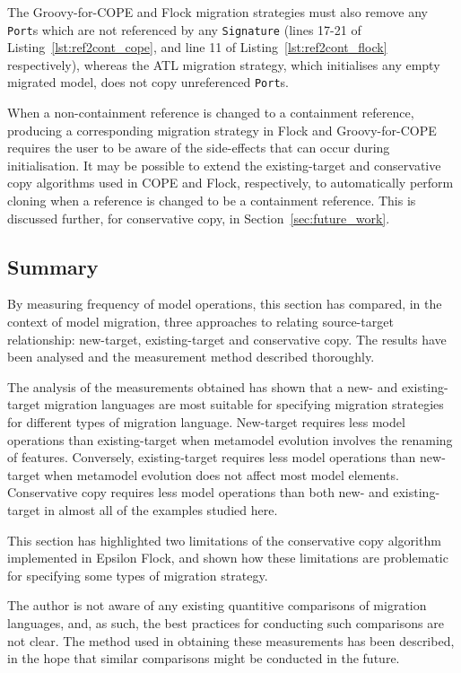 The Groovy-for-COPE and Flock migration strategies must also remove any \texttt{Port}s which are not referenced by any \texttt{Signature} (lines 17-21 of Listing~\ref{lst:ref2cont_cope}, and line 11 of Listing~\ref{lst:ref2cont_flock} respectively), whereas the ATL migration strategy, which initialises any empty migrated model, does not copy unreferenced \texttt{Port}s.

When a non-containment reference is changed to a containment reference, producing a corresponding migration strategy in Flock and Groovy-for-COPE requires the user to be aware of the side-effects that can occur during initialisation. It may be possible to extend the existing-target and conservative copy algorithms used in COPE and Flock, respectively, to automatically perform cloning when a reference is changed to be a containment reference. This is discussed further, for conservative copy, in Section~\ref{sec:future_work}.


\subsection{Summary}
By measuring frequency of model operations, this section has compared, in the context of model migration, three approaches to relating source-target relationship: new-target, existing-target and conservative copy. The results have been analysed and the measurement method described thoroughly.

The analysis of the measurements obtained has shown that a new- and existing-target migration languages are most suitable for specifying migration strategies for different types of migration language. New-target requires less model operations than existing-target when metamodel evolution involves the renaming of features. Conversely, existing-target requires less model operations than new-target when metamodel evolution does not affect most model elements. Conservative copy requires less model operations than both new- and existing-target in almost all of the examples studied here.

This section has highlighted two limitations of the conservative copy algorithm implemented in Epsilon Flock, and shown how these limitations are problematic for specifying some types of migration strategy. 

The author is not aware of any existing quantitive comparisons of migration languages, and, as such, the best practices for conducting such comparisons are not clear. The method used in obtaining these measurements has been described, in the hope that similar comparisons might be conducted in the future. 
